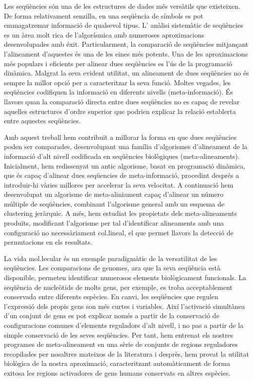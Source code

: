 \begin{small}
Les seqüències són una de les estructures de dades més versàtils que existeixen. De 
forma relativament senzilla, en una seqüència de símbols es pot emmagatzemar informació 
de qualsevol tipus. L' anàlisi sistemàtic de seqüències es un àrea molt rica de 
l'algorísmica amb numeroses aproximacions desenvolupades amb éxit. Particularment, la 
comparació de seqüències mitjançant l'alineament d'aquestes és una de les eines més 
potents. Una de les aproximacions més populars i eficients per alinear dues seqüències 
es l'ús de la programació dinàmica. Malgrat la seva evident utilitat, un alineament de 
dues seqüències no és sempre la millor opció per a caracteritzar la seva funció. Moltes 
vegades, les seqüències codifiquen la informació en diferents nivells (meta-informació). 
És llavors quan la comparació directa entre dues seqüències no es capaç de revelar aquelles 
estructures d'ordre superior que podrien explicar la relació establerta entre aquestes 
seqüències. 

Amb aquest treball hem contribuït a millorar la forma en que dues seqüències
poden ser comparades, desenvolupant una família d'algorismes d'alineament de la 
informació d'alt nivell codificada en seqüències biològiques 
(meta-alineaments).  Inicialment, hem redissenyat un antic algorisme, basat en 
programació dinàmica, que és capaç d'alinear dues seqüencies de meta-informació, 
procedint després a introduir-hi vàries millores per accelerar la seva velocitat. 
A continuació hem desenvolupat un algorisme de meta-aliniament capaç d'alinear 
un número múltiple de seqüències, combinant l'algorisme general amb un esquema de 
clustering jeràrquic. A més, hem estudiat les propietats dels meta-alineaments 
produïts, modificant l'algorisme per tal d'identificar alineaments amb una 
configuració no necessàriament col.lineal, el que permet llavors la detecció 
de permutacions en els resultats.

La vida mol.lecular és un exemple paradigmàtic de la versatilitat de les seqüències. 
Les comparacions de genomes, ara que la seva seqüència està disponible,
permeten identificar numerosos elements biològicament funcionals. La seqüència 
de nucleòtids de molts gens, per exemple, es troba acceptablement conservada 
entre diferents espècies. En canvi, les seqüències que regulen l'expressió dels 
propis gens son més curtes i variables. Així l'activació simultànea d'un conjunt
de gens es pot explicar només a partir de la conservació de configuracions comunes
d'elements reguladors d'alt nivell, i no pas a partir de la simple conservació
de les seves seqüències. Per tant, hem entrenat els nostres programes de 
meta-alineament en una sèrie de conjunts de regions reguladores recopilades
per nosaltres mateixos de la literatura i desprès, hem provat la utilitat 
biològica de la nostra aproximació, caracteritzant automàticament de forma exitosa 
les regions activadores de gens humans conservats en altres espècies.
\end{small}


